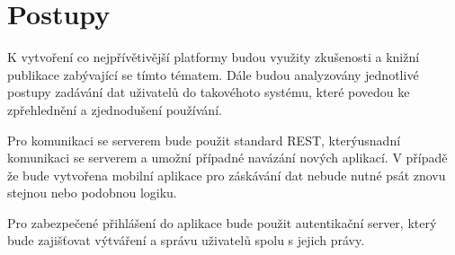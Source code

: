 \section*{Postupy}
\par K vytvoření co nejpřívětivější platformy budou využity zkušenosti a knižní publikace zabývající se tímto tématem. Dále budou analyzovány jednotlivé postupy zadávání dat uživatelů do takovéhoto systému, které povedou ke zpřehlednění a zjednodušení používání.
\par Pro komunikaci se serverem bude použit standard REST, kterýusnadní komunikaci se serverem a umožní případné navázání nových aplikací. V případě že bude vytvořena mobilní aplikace pro záskávání dat nebude nutné psát znovu stejnou nebo podobnou logiku.
\par Pro zabezpečené přihlášení do aplikace bude použit autentikační server, který bude zajišťovat výtváření a správu uživatelů spolu s jejich právy.
